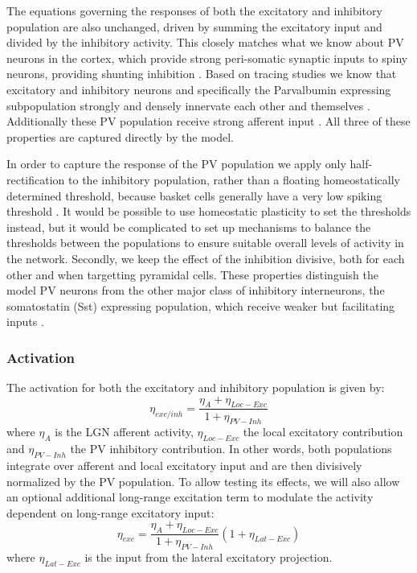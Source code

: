 The equations governing the responses of both the excitatory and
inhibitory population are also unchanged, driven by summing the
excitatory input and divided by the inhibitory activity. This closely
matches what we know about PV neurons in the cortex, which provide
strong peri-somatic synaptic inputs to spiny neurons, providing
shunting inhibition \citep{Atallah2012, Wilson2012}. Based on tracing
studies we know that excitatory and inhibitory neurons and
specifically the Parvalbumin expressing subpopulation strongly and
densely innervate each other and themselves \citep{Buzas2001, Ma2011,
  Pfeffer2013}. Additionally these PV population receive strong
afferent input \citep{Burkhalter2008}. All three of these properties
are captured directly by the model.

In order to capture the response of the PV population we apply only
half-rectification to the inhibitory population, rather than a
floating homeostatically determined threshold, because basket cells
generally have a very low spiking threshold \citep{Ma2011}.  It would
be possible to use homeostatic plasticity to set the thresholds
instead,
but it would be complicated to set up mechanisms to balance the
thresholds between the populations to ensure suitable overall levels
of activity in the network. Secondly, we keep the effect of the inhibition divisive,
both for each other and when targetting pyramidal cells. These
properties distinguish the model PV neurons from the other major class of inhibitory
interneurons, the somatostatin (Sst) expressing population, which
receive weaker but facilitating inputs
\citep{Beierlein2003,Bartley2008,Tan2008}.

\subsubsection{Activation}

The activation for both the excitatory and inhibitory population is
given by:
\begin{equation}
  \eta_{exc/inh} = \frac{\eta_{A} + \eta_{Loc-Exc}}{1 + \eta_{PV-Inh}}
\end{equation}
where $\eta_{A}$ is the LGN afferent activity, $\eta_{Loc-Exc}$ the
local excitatory contribution and $\eta_{PV-Inh}$ the PV inhibitory
contribution. In other words, both populations integrate over afferent
and local excitatory input and are then divisively normalized by the
PV population.  To allow testing its effects, we will also allow an
optional additional long-range excitation term to modulate the
activity dependent on long-range excitatory input:
\begin{equation}
  \eta_{exc} = \frac{\eta_{A} + \eta_{Loc-Exc}}{1 + \eta_{PV-Inh}} (1+\eta_{Lat-Exc})
\end{equation}
where $\eta_{Lat-Exc}$ is the input from the lateral excitatory
projection.


